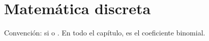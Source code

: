 \section{Matemática discreta}\label{sec:mate}

Convención:  si  o . En todo el
capítulo,  es el coeficiente binomial.





